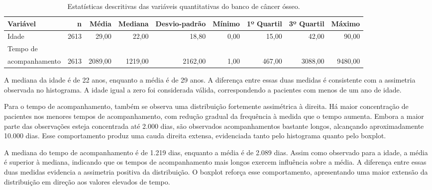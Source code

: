 \documentclass[11pt,a4paper]{article}
\begin{document}
\begin{table}[H]
\centering
\caption{Estatísticas descritivas das variáveis quantitativas do banco de câncer ósseo.}
\label{tab:estatisticas_quantitativas}

\begin{adjustbox}{max width=\textwidth}
\begin{tabular}{lrrrrrrrr}
\toprule
\textbf{Variável} & \textbf{n} & \textbf{Média} & \textbf{Mediana} & 
\textbf{Desvio-padrão} & \textbf{Mínimo} & \textbf{1º Quartil} & 
\textbf{3º Quartil} & \textbf{Máximo} \\
\midrule
Idade & 2613 & 29,00 & 22,00 & 18,80 & 0,00 & 15,00 & 42,00 & 90,00 \\
Tempo de \\ acompanhamento & 2613 & 2089,00 & 1219,00 & 2162,00 & 1,00 & 467,00 & 3088,00 & 9480,00 \\
\bottomrule
\end{tabular}
\end{adjustbox}

\end{table}

A mediana da idade é de 22 anos, enquanto a média é de 29 anos. A diferença entre essas duas medidas é consistente com a assimetria observada no histograma. A idade igual a zero foi considerada válida, correspondendo a pacientes com menos de um ano de idade.

Para o tempo de acompanhamento, também se observa uma distribuição fortemente assimétrica à direita. Há maior concentração de pacientes nos menores tempos de acompanhamento, com redução gradual da frequência à medida que o tempo aumenta. Embora a maior parte das observações esteja concentrada até 2.000 dias, são observados acompanhamentos bastante longos, alcançando aproximadamente 10.000 dias. Esse comportamento produz uma cauda direita extensa, evidenciada tanto pelo histograma quanto pelo boxplot.

A mediana do tempo de acompanhamento é de 1.219 dias, enquanto a média é de 2.089 dias. Assim como observado para a idade, a média é superior à mediana, indicando que os tempos de acompanhamento mais longos exercem influência sobre a média. A diferença entre essas duas medidas evidencia a assimetria positiva da distribuição. O boxplot reforça esse comportamento, apresentando uma maior extensão da distribuição em direção aos valores elevados de tempo.


\end{document}
